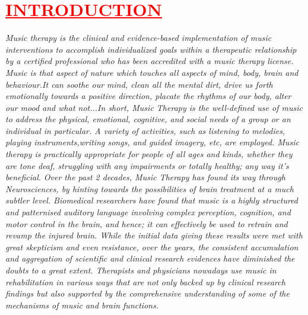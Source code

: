 \documentclass[12pt]{article}
\begin{document}
\section*{\textbf{\hspace{1cm}\textcolor{red}{\underline{\huge{INTRODUCTION}}}}}
\hspace{1cm}\Large{\emph{Music therapy is the clinical and evidence-based implementation of music interventions to accomplish individualized goals within a therapeutic relationship by a certified professional who has been accredited with a music therapy license. Music is that aspect of nature which touches all aspects of mind, body, brain and behaviour.It can soothe our mind, clean all the mental dirt, drive us forth emotionally towards a positive direction, placate the rhythms of our body, alter our mood and what not...In short, Music Therapy is the well-defined use of music to address the physical, emotional, cognitive, and social needs of a group or an individual in particular. A variety of activities, such as listening to melodies, playing instruments,writing songs, and guided imagery, etc, are employed. Music therapy is practically appropriate for people of all ages and kinds, whether they are tone deaf, struggling with any impairments or totally healthy; any way it's beneficial.}}\vspace{1cm}\newline
\hspace{1cm}\Large{\emph{Over the past 2 decades, Music Therapy has found its way through Neurosciences, by hinting towards the possibilities of brain treatment at a much subtler level. Biomedical researchers have found that music is a highly structured and patternised auditory language involving complex perception, cognition, and motor control in the brain, and hence; it can effectively be used to retrain and revamp the injured brain. While the initial data giving these results were met with great skepticism and even resistance, over the years, the consistent accumulation and aggregation of scientific and clinical research evidences have diminished the doubts to a great extent. Therapists and physicians nowadays use music in rehabilitation in various ways that are not only backed up by clinical research findings but also supported by the comprehensive  understanding of some of the mechanisms of music and brain functions.}}
\newpage
\end{document}
